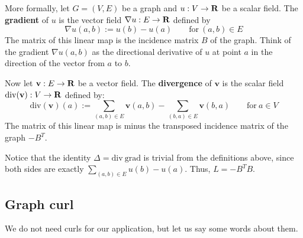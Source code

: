 
More formally,  
let $G=(V,E)$ be a graph and $u:V\to\mathbf{R}$ be a scalar field.
The {\bf gradient} of $u$ is the vector field $\nabla u:E\to\mathbf{R}$ defined by
\[
\nabla u(a,b) := u(b) - u(a)
\qquad \mathrm{for}\ (a,b)\in E
\]
The matrix of this linear map is the incidence matrix $B$ of the graph.
Think of the gradient $\nabla u(a,b)$ as the directional derivative of $u$
at point $a$ in the direction of the vector from $a$ to $b$.



Now let $\mathbf{v}:E\to\mathbf{R}$ be a vector field.
The {\bf divergence} of $\mathbf{v}$ is the scalar field
$\mathrm{div}(\mathbf{v}):V\to\mathbf{R}$ defined by:
\[
\mathrm{div}(\mathbf{v})(a)
:=
\sum_{(a,b)\in E}\mathbf{v}(a,b)
-\sum_{(b,a)\in E}\mathbf{v}(b,a)
\qquad \mathrm{for}\ a\in V
\]
The matrix of this linear map is minus the transposed incidence matrix of the
graph $-B^T$.



Notice that the identity $\Delta=\mathrm{div\ grad}$ is trivial from the
definitions above, since both sides are exactly $\sum_{(a,b)\in E}u(b)-u(a)$.
Thus, $L=-B^TB$.


\subsection{Graph curl}


We do not need curls for our application, but let us say some words about
them.



